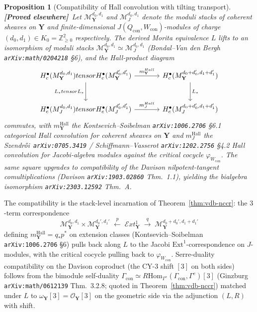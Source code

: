 \documentclass[11pt]{amsart}
\newtheorem{proposition}[theorem]{Proposition}
\theoremstyle{definition}
\providecommand{\bY}{\mathbf{Y}}
\providecommand{\cO}{\mathcal{O}}
\providecommand{\Hom}{\mathrm{Hom}}
\providecommand{\Ext}{\mathrm{Ext}}
\providecommand{\bZ}{\mathbb{Z}}
\providecommand{\ClaimStatusProvedElsewhere}{\textbf{\textsf{[Proved elsewhere]}}}
\begin{document}
\begin{proposition}[Compatibility of Hall convolution with tilting transport]
\label{prop:vdb-hall-compat}
\ClaimStatusProvedElsewhere\
Let $\mathcal{M}_\bY^{d_0, d_1}$ and $\mathcal{M}_J^{d_0, d_1}$ denote
the moduli stacks of coherent sheaves on $\bY$ and finite-dimensional
$J(Q_{\mathrm{con}}, W_{\mathrm{con}})$-modules of charge
$(d_0, d_1) \in K_0 = \bZ^2_{\geq 0}$ respectively. The derived Morita
equivalence $L$ lifts to an isomorphism of moduli stacks
$\mathcal{M}_\bY^{d_0, d_1} \simeq \mathcal{M}_J^{d_0, d_1}$ (Bondal--Van
den Bergh \texttt{arXiv:math/0204218} \S6), and the Hall-product diagram
\[
  \begin{tikzcd}[column sep=large, row sep=large]
    H^\bullet_c(\mathcal{M}_\bY^{d_0, d_1})
    \otimes H^\bullet_c(\mathcal{M}_\bY^{d_0', d_1'})
    \arrow[r, "m_\bY^{\mathrm{Hall}}"]
    \arrow[d, "L_* \otimes L_*"']
    &
    H^\bullet_c(\mathcal{M}_\bY^{d_0 + d_0', d_1 + d_1'})
    \arrow[d, "L_*"]
    \\
    H^\bullet_c(\mathcal{M}_J^{d_0, d_1})
    \otimes H^\bullet_c(\mathcal{M}_J^{d_0', d_1'})
    \arrow[r, "m_J^{\mathrm{Hall}}"]
    &
    H^\bullet_c(\mathcal{M}_J^{d_0 + d_0', d_1 + d_1'})
  \end{tikzcd}
\]
commutes, with $m_\bY^{\mathrm{Hall}}$ the Kontsevich--Soibelman
\texttt{arXiv:1006.2706} \S6.1 categorical Hall convolution for
coherent sheaves on $\bY$ and $m_J^{\mathrm{Hall}}$ the
Szendr\H{o}i~\texttt{arXiv:0705.3419} / Schiffmann--Vasserot
\texttt{arXiv:1202.2756} \S4.2 Hall convolution for Jacobi-algebra
modules against the critical cocycle $\varphi_{W_{\mathrm{con}}}$. The
same square upgrades to compatibility of the Davison nilpotent-tangent
\emph{comultiplications} (Davison \texttt{arXiv:1903.02860} Thm.~1.1),
yielding the bialgebra isomorphism \texttt{arXiv:2303.12592} Thm.~A.
\end{proposition}

The compatibility is the stack-level incarnation of
Theorem~\ref{thm:vdb-nccr}: the $3$-term correspondence
\[
  \mathcal{M}_\bY^{d_0, d_1} \times \mathcal{M}_\bY^{d_0', d_1'}
  \;\xleftarrow{\;p\;}\;
  \mathcal{E}xt^1_\bY
  \;\xrightarrow{\;q\;}\;
  \mathcal{M}_\bY^{d_0 + d_0', d_1 + d_1'}
\]
defining $m_\bY^{\mathrm{Hall}} = q_* p^*$ on extension classes
(Kontsevich--Soibelman \texttt{arXiv:1006.2706} \S6) pulls back along
$L$ to the Jacobi $\Ext^1$-correspondence on $J$-modules, with the
critical cocycle pulling back to $\varphi_{W_{\mathrm{con}}}$.
Serre-duality compatibility on the Davison coproduct (the CY-$3$ shift
$[3]$ on both sides) follows from the bimodule self-duality
$\Gamma_{\mathrm{con}} \simeq R\Hom_{\Gamma^e}(\Gamma_{\mathrm{con}},
\Gamma^e)[3]$ (Ginzburg \texttt{arXiv:math/0612139} Thm.~3.2.8; quoted
in Theorem~\ref{thm:vdb-nccr}) matched under $L$ to
$\omega_\bY[3] = \cO_\bY[3]$ on the geometric side via the adjunction
$(L, R)$ with shift.
\end{document}
